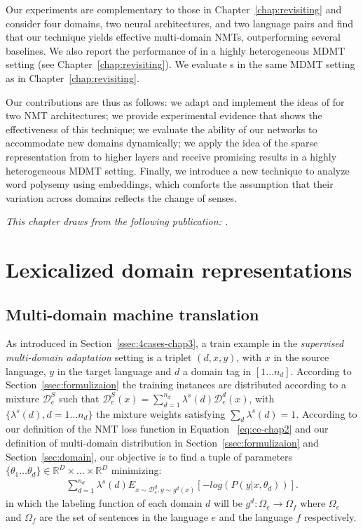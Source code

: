 Our experiments are complementary to those in Chapter~\ref{chap:revisiting} and consider four domains, two neural architectures, and two language pairs and find that our technique yields effective multi-domain NMTs, outperforming several baselines. We also report the performance of  in a highly heterogeneous MDMT setting (see Chapter~\ref{chap:revisiting}). We evaluate s in the same MDMT setting as in Chapter~\ref{chap:revisiting}.

Our contributions are thus as follows: we adapt and implement the ideas of \citet{Daume07frustratingly} for two NMT architectures; we provide experimental evidence that shows the effectiveness of this technique; we evaluate the ability of our networks to accommodate new domains dynamically; we apply the idea of the sparse representation from  to higher layers and receive promising results in a highly heterogeneous MDMT setting. Finally, we introduce a new technique to analyze word polysemy using embeddings, which comforts the assumption that their variation across domains reflects the change of senses.

\textit{This chapter draws from the following publication: \citet{Pham19generic}.}

\section{Lexicalized domain representations\label{sec:lexicalized_embeddings-chap5}}
\subsection{Multi-domain machine translation \label{ssec:statement-chap5}}
As introduced in Section~\ref{ssec:4cases-chap3}, a train example in the \emph{supervised multi-domain adaptation} setting is a triplet $(d,x,y)$, with $x$ in the source language, $y$ in the target language and $d$ a domain tag in $[1\dots n_d]$. According to Section~\ref{ssec:formulizaion} the training instances are distributed according to a mixture $\mathcal{D}_e^S$ such that $\mathcal{D}_e^S(x) = \sum_{d=1}^{n_d} \lambda^{s}(d) \mathcal{D}_e^d(x)$, with $\{\lambda^{s}(d), d=1 \dots n_d\}$ the mixture weights satisfying $\sum_d \lambda^{s}(d)=1$. According to our definition of the NMT loss function in Equation ~\eqref{eq:ce-chap2} and our definition of multi-domain distribution in Section~\ref{ssec:formulizaion} and Section~\ref{sec:domain}, our objective is to find a tuple of parameters $\{\theta_1 \dots \theta_d \} \in \mathbb{R}^D \times \dots \times \mathbb{R}^D$ minimizing:
\begin{equation} \label{eq:loss-chap5}
\begin{split}
\sum_{d=1}^{n_d} \lambda^{s}(d) E_{x \sim \mathcal{D}_e^d, y \sim g^d(x)} [-log(P(y|x,\theta_d))] \text{.}
\end{split}
\end{equation}
in which the labeling function of each domain $d$ will be $g^d: \Omega_{e} \rightarrow \Omega_{f}$ where $\Omega_{e}$ and $\Omega_{f}$ are the set of sentences in the language $e$ and the language $f$ respectively.

